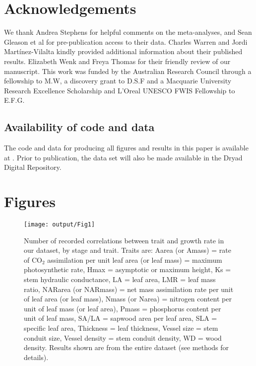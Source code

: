 \documentclass[a4paper,11pt]{article}
\begin{document}
\section*{Acknowledgements}\label{Acknowledgment}

We thank Andrea Stephens for helpful comments on the meta-analyses, and Sean Gleason et al for pre-publication access to their data. Charles Warren and Jordi Mart{\'{i}}nez-Vilalta kindly provided additional information about their published results. Elizabeth Wenk and Freya Thomas for their friendly review of our manuscript. This work was funded by the Australian Research Council through a fellowship to M.W, a discovery grant to D.S.F and a Macquarie University Research Excellence Scholarship and L'Oreal UNESCO FWIS Fellowship to E.F.G.

\subsection*{Availability of code and data}\label{code}

The code and data for producing all figures and results in this paper is available at . Prior to publication, the data set will also be made available in the Dryad Digital Repository.

\linespread{1}
\label{references}

\clearpage
\section*{Figures}

\begin{figure}[h!]
\centering
\texttt{[image: output/Fig1]}
\caption{Number of recorded correlations between trait and growth rate in our dataset, by stage and trait. Traits are: Aarea (or Amass) = rate of CO$_{2}$ assimilation per unit leaf area (or leaf mass) = maximum photosynthetic rate, Hmax = asymptotic or maximum height, Ks = stem hydraulic conductance, LA = leaf area, LMR = leaf mass ratio, NARarea  (or NARmass) = net mass assimilation rate per unit of leaf area (or leaf mass), Nmass (or Narea) = nitrogen content per unit of leaf mass (or leaf area), Pmass = phosphorus content per unit of leaf mass, SA/LA = sapwood area per leaf area, SLA = specific leaf area, Thickness = leaf thickness, Vessel size = stem conduit size, Vessel density = stem conduit density, WD = wood density. Results shown are from the entire dataset (see methods for details).}
\label{fig:fig1}
\end{figure}
\end{document}
